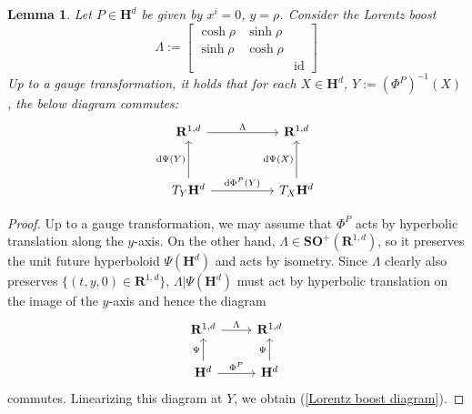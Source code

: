 \documentclass[reqno,10pt]{amsart}
\newcommand{\RR}{\mathbf{R}}
\newcommand{\Hyp}{\mathbf H}
\newcommand{\SpOrth}{\mathbf{SO}}
\DeclareMathOperator{\id}{id}
\newcommand*\dif{\mathop{}\!\mathrm{d}}
\newtheorem{lemma}[theorem]{Lemma}
\theoremstyle{definition}
\numberwithin{equation}{section}
\begin{document}
\begin{lemma}
Let $P \in \Hyp^d$ be given by $x^i = 0$, $y = \rho$. Consider the Lorentz boost
$$\Lambda := \begin{bmatrix}\cosh \rho & \sinh \rho \\ \sinh \rho & \cosh \rho \\ &&\id\end{bmatrix}$$
Up to a gauge transformation, it holds that for each $X \in \Hyp^d$, $Y := (\Phi^P)^{-1}(X)$, the below diagram commutes:
\begin{equation}\label{Lorentz boost diagram}
\begin{tikzcd}[column sep=50pt, row sep=30pt]
\RR^{1, d} \arrow[r, "\Lambda"] & \RR^{1, d} \\
T_Y \Hyp^d \arrow[u, "\dif \Psi(Y)"] \arrow[r, "\dif \Phi^P(Y)"] & T_X \Hyp^d \arrow[u, "\dif \Psi(X)"]
\end{tikzcd}
\end{equation}
\end{lemma}
\begin{proof}
Up to a gauge transformation, we may assume that $\Phi^P$ acts by hyperbolic translation along the $y$-axis.
On the other hand, $\Lambda \in \SpOrth^+(\RR^{1, d})$, so it preserves the unit future hyperboloid $\Psi(\Hyp^d)$ and acts by isometry.
Since $\Lambda$ clearly also preserves $\{(t, y, 0) \in \RR^{1, d}\}$, $\Lambda|\Psi(\Hyp^d)$ must act by hyperbolic translation on the image of the $y$-axis and hence the diagram
$$
\begin{tikzcd}
\RR^{1, d} \arrow[r, "\Lambda"] & \RR^{1, d} \\
\Hyp^d \arrow[u, "\Psi"] \arrow[r, "\Phi^P"] & \Hyp^d \arrow[u, "\Psi"]
\end{tikzcd}
$$
commutes. Linearizing this diagram at $Y$, we obtain (\ref{Lorentz boost diagram}).
\end{proof}
\end{document}
